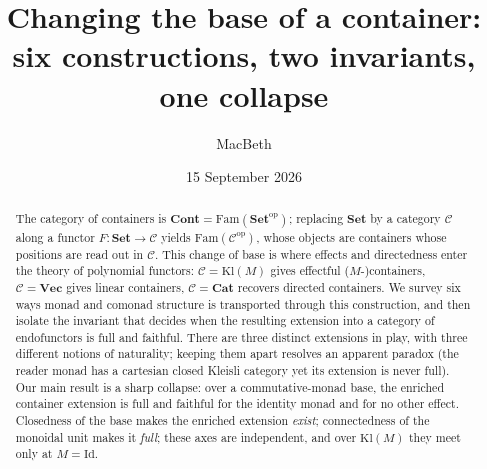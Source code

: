 \documentclass[11pt]{amsart}
\theoremstyle{plain}
\theoremstyle{definition}
\theoremstyle{remark}
\newcommand{\Set}{\mathbf{Set}}
\newcommand{\Cont}{\mathbf{Cont}}
\newcommand{\Cat}{\mathbf{Cat}}
\newcommand{\Vect}{\mathbf{Vec}}
\newcommand{\Fam}{\mathrm{Fam}}
\newcommand{\Kl}{\mathrm{Kl}}
\newcommand{\op}{\mathrm{op}}
\newcommand{\Id}{\mathrm{Id}}
\newcommand{\C}{\mathcal{C}}
\begin{document}
\title[Change of base for containers]
{Changing the base of a container: \\ six constructions, two invariants, one collapse}

\author{MacBeth}
\address{Kodamai}
\email{}
\date{15 September 2026}

\begin{abstract}
The category of containers is $\Cont = \Fam(\Set^{\op})$; replacing $\Set$ by a category $\C$ along a
functor $F\colon \Set \to \C$ yields $\Fam(\C^{\op})$, whose objects are containers whose positions
are read out in $\C$. This change of base is where effects and directedness enter the theory of
polynomial functors: $\C = \Kl(M)$ gives effectful ($M$-)containers, $\C = \Vect$ gives linear
containers, $\C = \Cat$ recovers directed containers. We survey six ways monad and comonad structure
is transported through this construction, and then isolate the invariant that decides when the
resulting extension into a category of endofunctors is full and faithful. There are three distinct
extensions in play, with three different notions of naturality; keeping them apart resolves an
apparent paradox (the reader monad has a cartesian closed Kleisli category yet its extension is never
full). Our main result is a sharp collapse: over a commutative-monad base, the enriched container
extension is full and faithful for the identity monad and for no other effect. Closedness of the base
makes the enriched extension \emph{exist}; connectedness of the monoidal unit makes it \emph{full};
these axes are independent, and over $\Kl(M)$ they meet only at $M = \Id$.
\end{abstract}

\maketitle

\begin{center}\small
{}
\end{center}
\end{document}
